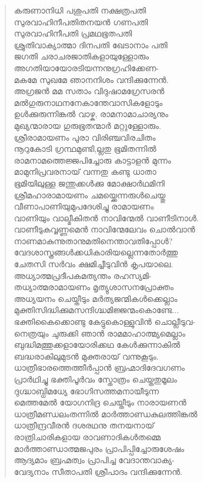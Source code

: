 \begin{verse}
കരുണാനിധി പശുപതി നക്ഷത്രപതി\\
സുരവാഹിനീപതിതനയന്‍ ഗണപതി\\
സുരവാഹിനീപതി പ്രമഥഭൂതപതി\\
ശ്രുതിവാക്യാത്മാ ദിനപതി ഖേടാനാം പതി\\
ജഗതി ചരാചരജാതികളായുള്ളോരും\\
അഗതിയായോരടിയന്നനുഗ്രഹിക്കേണ-\\
മകമേ സുഖമേ ഞാനനിശം വന്ദിക്കുന്നേന്‍.\\
അഗ്രജന്‍ മമ സതാം വിദുഷാമഗ്രേസരന്‍\\
മല്‍ഗുരുനാഥനനേകാന്തേവാസികളോടും\\
ഉള്‍ക്കുരുന്നിങ്കല്‍ വാഴ്ക, രാമനാമാചാര്യനും\\
മുഖ്യന്മാരായ ഗുരുഭൂതന്മാര്‍ മറ്റുള്ളോരും.\\
ശ്രീരാമായണം പുരാ വിരിഞ്ചവിരചിതം\\
നൂറുകോടി ഗ്രന്ഥമുണ്ടി,ല്ലതു ഭൂമിതന്നില്‍\\
രാമനാമത്തെജ്ജപിച്ചോരു കാട്ടാളന്‍ മുന്നം\\
മാമുനിപ്രവരനായ് വന്നതു കണ്ടു ധാതാ\\
ഭൂമിയിലുള്ള ജന്തുക്കള്‍ക്കു മോക്ഷാര്‍ഥമിനി\\
ശ്രീമഹാരാമായണം ചമയ്ക്കെന്നരുള്‍ചെയ്തു\\
വീണാപാണിയുമുപദേശിച്ചു രാമായണം\\
വാണിയും വാല്മീകിതന്‍ നാവിന്മേല്‍ വാണീടിനാള്‍.\\
വാണീടുകവ്വണ്ണമെന്‍ നാവിന്മേലേവം ചൊല്‍വാന്‍\\
നാണമാകുന്നുതാനുമതിനെന്താവതിപ്പോള്‍?\\
വേദശാസ്ത്രങ്ങള്‍ക്കധികാരിയല്ലെന്നതോര്‍ത്തു\\
ചേതസി സര്‍വം ക്ഷമിച്ചീടുവിന്‍ കൃപയാലെ.\\
അധ്യാത്മപ്രദീപകമത്യന്തം രഹസ്യമി-\\
തധ്യാത്മരാമായണം മൃത്യുശാസനപ്രോക്തം\\
അധ്യയനം ചെയ്തീടും മര്‍ത്യജന്മികള്‍ക്കെല്ലാം\\
മുക്തിസിദ്ധിക്കുമസന്ദിഗ്ദ്ധമിജ്ജന്മംകൊണ്ടേ...\\
ഭക്തികൈക്കൊണ്ടു കേട്ടുകൊള്ളുവിന്‍ ചൊല്ലീടുവ-\\
നെത്രയും ചുരുക്കി ഞാന്‍ രാമമാഹാത്മ്യമെല്ലാം\\
ബുദ്ധിമത്തുക്കളായോരിക്കഥ കേള്‍ക്കുന്നാകില്‍\\
ബദ്ധരാകിലുമുടന്‍ മുക്തരായ് വന്നുകൂടും.\\
ധാത്രീഭാരത്തെത്തീര്‍പ്പാന്‍ ബ്രഹ്മാദിദേവഗണം\\
പ്രാര്‍ഥിച്ചു ഭക്തിപൂര്‍വം സ്തോത്രം ചെയ്തതുമൂലം\\
ദുഗ്ദ്ധാബ്ധിമധ്യേ ഭോഗിസത്തമനായീടുന്ന\\
മെത്തമേല്‍ യോഗനിദ്ര ചെയ്തീടും നാരായണന്‍\\
ധാത്രീമണ്ഡലംതന്നില്‍ മാര്‍ത്താണ്ഡകുലത്തിങ്കല്‍\\
ധാത്രീന്ദ്രവീരന്‍ ദശരഥനു തനയനായ്\\
രാത്രിചാരികളായ രാവണാദികള്‍തമ്മെ\\
മാര്‍ത്താണ്ഡാത്മജപുരം പ്രാപിപ്പിച്ചോരുശേഷം\\
ആദ്യമാം ബ്രഹ്മത്വം പ്രാപിച്ച വേദാന്തവാക്യ-\\
വേദ്യനാം സീതാപതി ശ്രീപാദം വന്ദിക്കുന്നേന്‍.
\end{verse}

